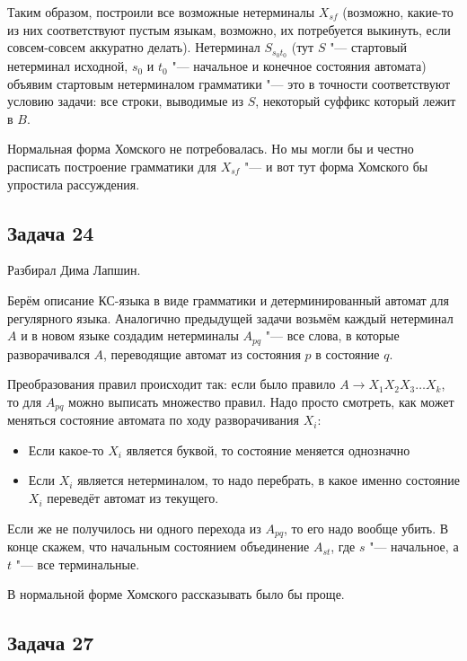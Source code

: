 	Таким образом, построили все возможные нетерминалы $X_{sf}$ (возможно, какие-то из них соответствуют пустым языкам,
	возможно, их потребуется выкинуть, если совсем-совсем аккуратно делать).
	Нетерминал $S_{s_0t_0}$ (тут $S$ "--- стартовый нетерминал исходной, $s_0$ и $t_0$ "--- начальное и конечное состояния автомата)
	объявим стартовым нетерминалом грамматики "--- это в точности соответствуют условию задачи: все строки, выводимые из $S$,
	некоторый суффикс который лежит в $B$.

	\begin{Rem}
		Нормальная форма Хомского не потребовалась.
		Но мы могли бы и честно расписать построение грамматики для $X_{sf}$ "--- и вот тут форма Хомского бы упростила рассуждения.
	\end{Rem}

\subsection{Задача 24}
	Разбирал Дима Лапшин.

	Берём описание КС-языка в виде грамматики и детерминированный автомат для регулярного языка.
	Аналогично предыдущей задачи возьмём каждый нетерминал $A$ и в новом языке создадим
	нетерминалы $A_{pq}$ "--- все слова, в которые разворачивался $A$, переводящие автомат
	из состояния $p$ в состояние $q$.

	Преобразования правил происходит так: если было правило $A \to X_1X_2X_3\dots X_k$, то для $A_{pq}$ можно выписать множество правил.
	Надо просто смотреть, как может меняться состояние автомата по ходу разворачивания $X_i$:
	\begin{itemize}
		\item
			Если какое-то $X_i$ является буквой, то состояние меняется однозначно
		\item
			Если $X_i$ является нетерминалом, то надо перебрать, в какое именно состояние $X_i$ переведёт автомат из текущего.
	\end{itemize}
	Если же не получилось ни одного перехода из $A_{pq}$, то его надо вообще убить.
	В конце скажем, что начальным состоянием объединение $A_{st}$, где $s$ "--- начальное, а $t$ "--- все терминальные.

	\begin{Rem}
		В нормальной форме Хомского рассказывать было бы проще.
	\end{Rem}

\subsection{Задача 27}
